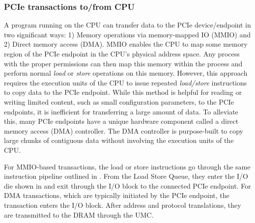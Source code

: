 \subsubsection{PCIe transactions to/from CPU}
\label{subsubsec:interconnect-sc-background-cpu-arch-pcie-transactions}

A program running on the CPU can transfer data to the PCIe device/endpoint in two significant ways: 1) Memory operations via memory-mapped IO (MMIO) and 2) Direct memory access (DMA).
MMIO enables the CPU to map some memory region of the PCIe endpoint in the CPU's physical address space.
Any process with the proper permissions can then map this memory within the process and perform normal \textit{load} or \textit{store} operations on this memory.
However, this approach requires the execution units of the CPU to issue repeated \textit{load/store} instructions to copy data to the PCIe endpoint.
While this method is helpful for reading or writing limited content, such as small configuration parameters, to the PCIe endpoints, it is inefficient for transferring a large amount of data.
To alleviate this, many PCIe endpoints have a unique hardware component called a direct memory access (DMA) controller.
The DMA controller is purpose-built to copy large chunks of contiguous data without involving the execution units of the CPU.

For MMIO-based transactions, the load or store instructions go through the same instruction pipeline outlined in . 
From the Load Store Queue, they enter the I/O die shown in  and exit through the I/O block to the connected PCIe endpoint.
For DMA transactions, which are typically initiated by the PCIe endpoint, the transaction enters the I/O block. 
After address and protocol translations, they are transmitted to the DRAM through the UMC.